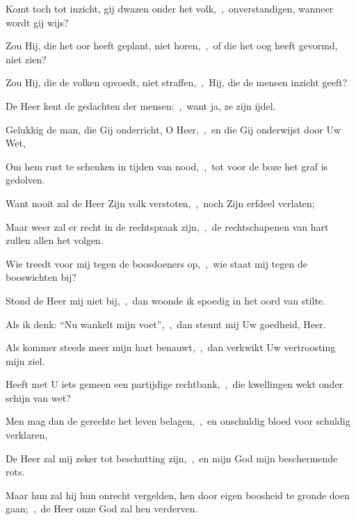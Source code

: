 \documentclass[12pt,twoside,a5paper]{article}
\begin{document}
\begin{halfparskip}

  Komt toch tot inzicht, gij dwazen onder het volk,~\sep\ onverstandigen, wanneer wordt gij wijs?

  Zou Hij, die het oor heeft geplant, niet horen,~\sep\ of die het oog heeft gevormd, niet zien?

  Zou Hij, die de volken opvoedt, niet straffen,~\sep\ Hij, die de mensen inzicht geeft?

  De Heer kent de gedachten der mensen:~\sep\ want ja, ze zijn ijdel.
\end{halfparskip}

\begin{halfparskip}

  Gelukkig de man, die Gij onderricht, O Heer,~\sep\ en die Gij onderwijst door Uw Wet,

  Om hem rust te schenken in tijden van nood,~\sep\ tot voor de boze het graf is gedolven.

  Want nooit zal de Heer Zijn volk verstoten,~\sep\ noch Zijn erfdeel verlaten;

  Maar weer zal er recht in de rechtspraak zijn,~\sep\ de rechtschapenen van hart zullen allen het volgen.

  Wie treedt voor mij tegen de boosdoeners op,~\sep\ wie staat mij tegen de booswichten bij?

  Stond de Heer mij niet bij,~\sep\ dan woonde ik spoedig in het oord van stilte.

  Als ik denk: ``Nu wankelt mijn voet'',~\sep\ dan steunt mij Uw goedheid, Heer.

  Als kommer steeds meer mijn hart benauwt,~\sep\ dan verkwikt Uw vertroosting mijn ziel.

  Heeft met U iets gemeen een partijdige rechtbank,~\sep\ die kwellingen wekt onder schijn van wet?

  Men mag dan de gerechte het leven belagen,~\sep\ en onschuldig bloed voor schuldig verklaren,

  De Heer zal mij zeker tot beschutting zijn,~\sep\ en mijn God mijn beschermende rots.

  Maar hun zal hij hun onrecht vergelden, hen door eigen boosheid te gronde doen gaan;~\sep\ de Heer onze God zal hen verderven.
\end{halfparskip}

\end{document}
